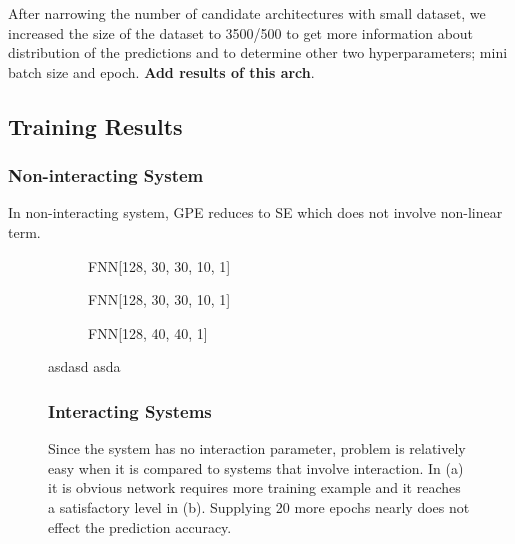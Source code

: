 \documentclass[a4paper,times,12pt]{article}
\begin{document}
After narrowing the number of candidate architectures with small dataset, we increased the size of the dataset to 3500/500 to get more information about distribution of the predictions and to determine other two hyperparameters; mini batch size and epoch. \textbf{Add results of this arch}.



\subsection{Training Results}
\subsubsection{Non-interacting System}

In non-interacting system, GPE reduces to SE which does not involve non-linear term. 

\begin{figure}[H]
    \centering
    \begin{subfigure}[t]{0.45\textwidth}
		\centering
        
        \caption{FNN[128, 30, 30, 10, 1]}
		\label{fig:a}
    \end{subfigure}\hfill
    \begin{subfigure}[t]{0.45\textwidth}
		\centering
        
        \caption{FNN[128, 30, 30, 10, 1]}
		\label{fig:a}
    \end{subfigure}\hfill    
    \begin{subfigure}[t]{0.45\textwidth}
        \centering
        
        \caption{FNN[128, 40, 40, 1]}
		\label{fig:b}
    \end{subfigure}
    \caption{Since the system has no interaction parameter, problem is relatively easy when it is compared to systems that involve interaction. In (a) it is obvious network requires more training example and it reaches a satisfactory level in (b). Supplying 20 more epochs nearly does not effect the prediction accuracy.  }

asdasd
asda

\subsubsection{Interacting Systems}



    

\end{figure}


\newpage
\end{document}
